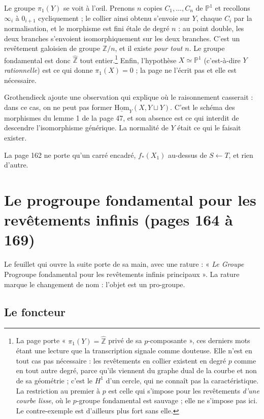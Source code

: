 \documentclass[11pt,a4paper]{article}
\begin{document}
Le groupe $\pi_{1}(Y)$ se voit à l'œil. Prenons $n$ copies
$C_{1}, \dots, C_{n}$ de $\mathbb{P}^{1}$ et recollons $\infty_{i}$ à
$0_{i+1}$ cycliquement ; le collier ainsi obtenu s'envoie sur $Y$, chaque
$C_{i}$ par la normalisation, et le morphisme est fini étale de degré $n$ :
au point double, les deux branches s'envoient isomorphiquement sur les deux
branches. C'est un revêtement galoisien de groupe $\mathbb{Z}/n$, et il existe
\emph{pour tout $n$}. Le groupe fondamental est donc $\hat{\mathbb{Z}}$ tout
entier.\footnote{La page porte « $\pi_{1}(Y) = \hat{\mathbb{Z}}$
privé de sa $p$-composante », ces derniers mots étant une lecture que la
transcription signale comme douteuse. Elle n'est en tout cas pas nécessaire :
les revêtements en collier existent en degré $p$ comme en tout autre degré,
parce qu'ils viennent du graphe dual de la courbe et non de sa géométrie ;
c'est le $H^{1}$ d'un cercle, qui ne connaît pas la caractéristique. La
restriction au premier à $p$ est celle qui s'impose pour les revêtements
\emph{d'une courbe lisse}, où le $p$-groupe fondamental est sauvage ; elle ne
s'impose pas ici. Le contre-exemple est d'ailleurs plus fort sans elle.}
Enfin, l'hypothèse $X \simeq \mathbb{P}^{1}$ (c'est-à-dire $Y$
\emph{rationnelle}) est ce qui donne $\pi_{1}(X) = 0$ ; la page ne l'écrit
pas et elle est nécessaire.

Grothendieck ajoute une observation qui explique où le raisonnement casserait :
dans ce cas, on ne peut pas former $\underline{\mathrm{Hom}}_{Y}(X, Y \sqcup
Y)$. C'est le schéma des morphismes du lemme 1 de la page 47, et son absence
est ce qui interdit de descendre l'isomorphisme générique. La normalité de $Y$
était ce qui le faisait exister.

La page 162 ne porte qu'un carré encadré, $f_{*}(X_{1})$ au-dessus de
$S \leftarrow T$, et rien d'autre.

\section*{Le progroupe fondamental pour les revêtements infinis (pages 164 à 169)}

Le feuillet qui ouvre la suite porte de sa main, avec une rature :
« \emph{Le Groupe} \; Progroupe fondamental pour les revêtements infinis
principaux ». La rature marque le changement de nom : l'objet est un
pro-groupe.

\subsection*{Le foncteur}
\end{document}
